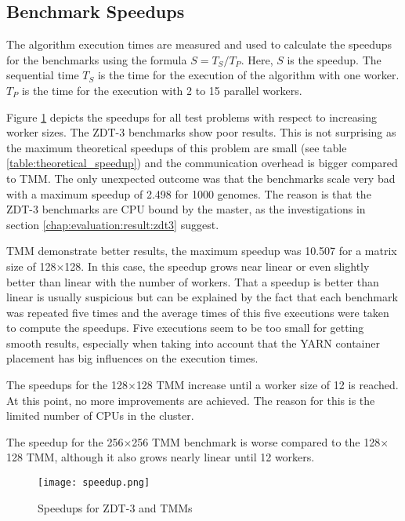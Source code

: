 \subsection{Benchmark Speedups}


The algorithm execution times are measured and used to calculate the speedups for the benchmarks using the formula $S = T_S / T_P$. Here, $S$ is the speedup. The sequential time $T_S$ is the time for the execution of the algorithm with one worker. $T_P$ is the time for the execution with 2 to 15 parallel workers.


Figure \ref{fig:speedup} depicts the speedups for all test problems with respect to increasing worker sizes. The ZDT-3 benchmarks show poor results. This is not surprising as the maximum theoretical speedups of this problem are small (see table \ref{table:theoretical_speedup}) and the communication overhead is bigger compared to TMM. The only unexpected outcome was that the benchmarks scale very bad with a maximum speedup of 2.498 for 1000 genomes. The reason is that the ZDT-3 benchmarks are CPU bound by the master, as the investigations in section \ref{chap:evaluation:result:zdt3} suggest.

TMM demonstrate better results, the maximum speedup was 10.507 for a matrix size of 128$\times$128. In this case, the speedup grows near linear or even slightly better than linear with the number of workers. That a speedup is better than linear is usually suspicious but can be explained by the fact that each benchmark was repeated five times and the average times of this five executions were taken to compute the speedups. Five executions seem to be too small for getting smooth results, especially when taking into account that the YARN container placement has big influences on the execution times.

The speedups for the 128$\times$128 TMM increase until a worker size of 12 is reached. At this point, no more improvements are achieved. The reason for this is the limited number of CPUs in the cluster.

The speedup for the 256$\times$256 TMM benchmark is worse compared to the 128$\times$128 TMM, although it also grows nearly linear until 12 workers.

\begin{figure}
  \centering
  \texttt{[image: speedup.png]}
  \caption[Speedups for ZDT-3 and TMMs]{Speedups for ZDT-3 and TMMs}
  \label{fig:speedup}
\end{figure}

